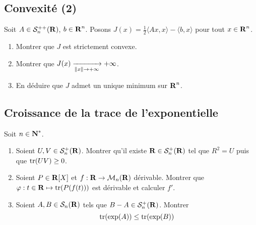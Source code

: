 \begin{correction}
	[À rédiger]
\end{correction}

\subsection{Convexité (2)}
\begin{exercice}
	Soit $A\in\mathcal S_n^{++}(\operatorname{\mathbf{R}})$, $b\in\operatorname{\mathbf{R}}^n$.
	Posons $J(x)=\frac12\langle Ax,x\rangle - \langle b,x\rangle$ pour tout $x\in\operatorname{\mathbf{R}}^n$.
	\begin{enumerate}
		\item Montrer que $J$ est strictement convexe.
		\item Montrer que $J(x)\xrightarrow[\left\lVert x\right\rVert\to+\infty]{}+\infty$.
		\item En déduire que $J$ admet un unique minimum sur $\operatorname{\mathbf{R}}^n$.
	\end{enumerate}
\end{exercice}

\begin{correction}
	[À rédiger]
\end{correction}

\subsection{Croissance de la trace de l'exponentielle}
\begin{exercice}
	Soit $n\in\operatorname{\mathbf{N}}^*$.
	\begin{enumerate}
		\item Soient $U,V\in\mathcal S_n^+(\operatorname{\mathbf{R}})$. Montrer qu'il existe $\operatorname{\mathbf{R}}\in\mathcal S_n^+(\operatorname{\mathbf{R}})$ tel que $R^2 = U$ puis que $\operatorname{tr}(UV)\geq 0$.
		\item Soient $P\in\operatorname{\mathbf{R}}[X]$ et $f:\operatorname{\mathbf{R}}\to\mathcal M_n(\operatorname{\mathbf{R}})$ dérivable. Montrer que $\varphi:t\in\operatorname{\mathbf{R}}\mapsto\operatorname{tr}(P(f(t)))$ est dérivable et calculer $f'$.
		\item Soient $A,B\in\mathcal S_n(\operatorname{\mathbf{R}})$ tels que $B-A\in\mathcal S_n^+(\operatorname{\mathbf{R}})$. Montrer 
		\[
			\operatorname{tr}(\exp(A))\leq\operatorname{tr}(\exp(B))
		\]
	\end{enumerate}
\end{exercice}

